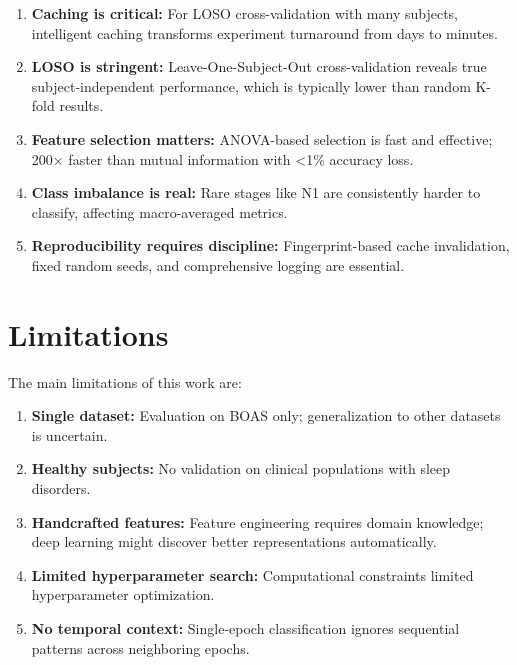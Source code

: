 \begin{enumerate}
    \item \textbf{Caching is critical:} For LOSO cross-validation with many subjects, intelligent caching transforms experiment turnaround from days to minutes.

    \item \textbf{LOSO is stringent:} Leave-One-Subject-Out cross-validation reveals true subject-independent performance, which is typically lower than random K-fold results.

    \item \textbf{Feature selection matters:} ANOVA-based selection is fast and effective; 200× faster than mutual information with <1\% accuracy loss.

    \item \textbf{Class imbalance is real:} Rare stages like N1 are consistently harder to classify, affecting macro-averaged metrics.

    \item \textbf{Reproducibility requires discipline:} Fingerprint-based cache invalidation, fixed random seeds, and comprehensive logging are essential.
\end{enumerate}

\section{Limitations}
\label{sec:conclusion_limitations}

The main limitations of this work are:

\begin{enumerate}
    \item \textbf{Single dataset:} Evaluation on BOAS only; generalization to other datasets is uncertain.

    \item \textbf{Healthy subjects:} No validation on clinical populations with sleep disorders.

    \item \textbf{Handcrafted features:} Feature engineering requires domain knowledge; deep learning might discover better representations automatically.

    \item \textbf{Limited hyperparameter search:} Computational constraints limited hyperparameter optimization.

    \item \textbf{No temporal context:} Single-epoch classification ignores sequential patterns across neighboring epochs.
\end{enumerate}

